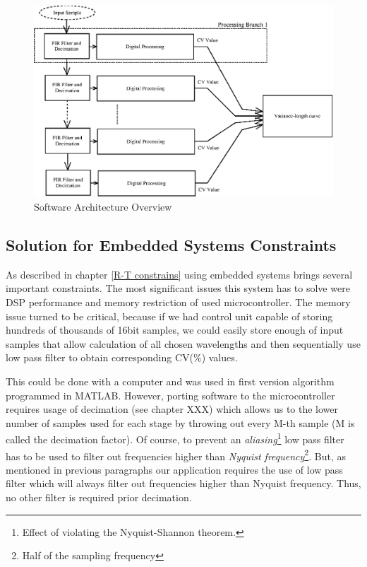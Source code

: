 \documentclass[twoside]{ctuthesis}
\theoremstyle{plain}
\theoremstyle{definition}
\theoremstyle{note}
\begin{document}
\begin{figure}[h]
	\centering
	\includegraphics[width=1.0\textwidth]{system_overview.eps}
	\caption{Software Architecture Overview}
	\label{fig:software_overview}
\end{figure}

\subsection{Solution for Embedded Systems Constraints}
\label{sec:SolutionForEmbedded}
As described in chapter \ref{R-T constrains} using embedded systems brings several important constraints. The most significant issues this system has to solve were DSP performance and memory restriction of used microcontroller. The memory issue turned to be critical, because if we had control unit capable of storing hundreds of thousands of 16bit samples, we could easily store enough of input samples that allow calculation of all chosen wavelengths and then sequentially use low pass filter to obtain corresponding CV(\%) values. 

This could be done with a computer and was used in first version algorithm programmed in MATLAB. However, porting software to the microcontroller requires usage of decimation (see chapter XXX) which allows us to the lower number of samples used for each stage by throwing out every M-th sample (M is called the decimation factor). Of course, to prevent an \textit{aliasing}\footnote{Effect of violating the Nyquist-Shannon theorem.} low pass filter has to be used to filter out frequencies higher than \textit{Nyquist frequency}\footnote{Half of the sampling frequency}. But, as mentioned in previous paragraphs our application requires the use of low pass filter which will always filter out frequencies higher than Nyquist frequency. Thus, no other filter is required prior decimation.
\end{document}
